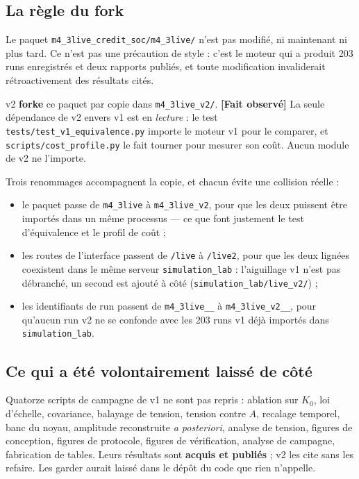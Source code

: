 \documentclass[11pt,a4paper]{article}
\newcommand{\code}[1]{\texttt{#1}}
\newcommand{\fait}{\textbf{[Fait observé]}}
\begin{document}
\subsection{La règle du fork}
\label{sec:fork}

Le paquet \code{m4\_3live\_credit\_soc/m4\_3live/} n'est pas modifié, ni
maintenant ni plus tard. Ce n'est pas une précaution de style : c'est le moteur
qui a produit 203 runs enregistrés et deux rapports publiés, et toute
modification invaliderait rétroactivement des résultats cités.

v2 \textbf{forke} ce paquet par copie dans \code{m4\_3live\_v2/}. \fait{} La
seule dépendance de v2 envers v1 est en \emph{lecture} : le test
\code{tests/test\_v1\_equivalence.py} importe le moteur v1 pour le comparer, et
\code{scripts/cost\_profile.py} le fait tourner pour mesurer son coût. Aucun
module de v2 ne l'importe.

Trois renommages accompagnent la copie, et chacun évite une collision réelle :

\begin{itemize}
\item le paquet passe de \code{m4\_3live} à \code{m4\_3live\_v2}, pour que les
  deux puissent être importés dans un même processus --- ce que font justement
  le test d'équivalence et le profil de coût ;
\item les routes de l'interface passent de \code{/live} à \code{/live2}, pour
  que les deux lignées coexistent dans le même serveur \code{simulation\_lab} :
  l'aiguillage v1 n'est pas débranché, un second est ajouté à côté
  (\code{simulation\_lab/live\_v2/}) ;
\item les identifiants de run passent de \code{m4\_3live\_\_} à
  \code{m4\_3live\_v2\_\_}, pour qu'aucun run v2 ne se confonde avec les 203
  runs v1 déjà importés dans \code{simulation\_lab}.
\end{itemize}

\subsection{Ce qui a été volontairement laissé de côté}

Quatorze scripts de campagne de v1 ne sont pas repris : ablation sur $K_0$, loi
d'échelle, covariance, balayage de tension, tension contre $A$, recalage
temporel, banc du noyau, amplitude reconstruite \emph{a posteriori}, analyse de
tension, figures de conception, figures de protocole, figures de vérification,
analyse de campagne, fabrication de tables. Leurs résultats sont \textbf{acquis
et publiés} ; v2 les cite sans les refaire. Les garder aurait laissé dans le
dépôt du code que rien n'appelle.
\end{document}
